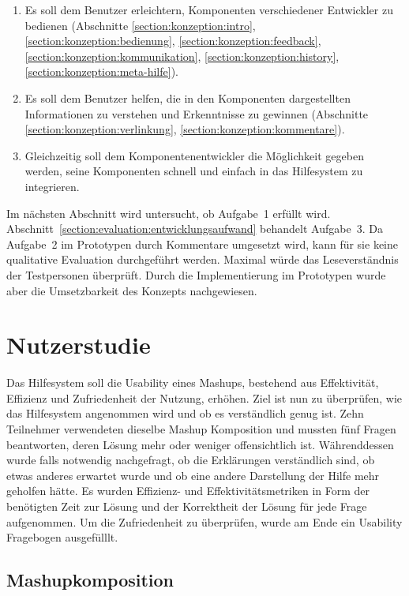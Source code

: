 \documentclass[
	headsepline,
	footsepline,
	fontsize=12pt,
	bibliography=totoc
]{scrbook}
\begin{document}
\begin{enumerate}
	\item Es soll dem Benutzer erleichtern, Komponenten verschiedener Entwickler zu bedienen (Abschnitte \ref{section:konzeption:intro}, \ref{section:konzeption:bedienung}, \ref{section:konzeption:feedback}, \ref{section:konzeption:kommunikation}, \ref{section:konzeption:history}, \ref{section:konzeption:meta-hilfe}).
	\item Es soll dem Benutzer helfen, die in den Komponenten dargestellten Informationen zu verstehen und Erkenntnisse zu gewinnen (Abschnitte \ref{section:konzeption:verlinkung}, \ref{section:konzeption:kommentare}).
	\item Gleichzeitig soll dem Komponentenentwickler die Möglichkeit gegeben werden, seine Komponenten schnell und einfach in das Hilfesystem zu integrieren.
\end{enumerate}

Im nächsten Abschnitt wird untersucht, ob Aufgabe~1 erfüllt wird. Abschnitt~\ref{section:evaluation:entwicklungsaufwand} behandelt Aufgabe~3. Da Aufgabe~2 im Prototypen durch Kommentare umgesetzt wird, kann für sie keine qualitative Evaluation durchgeführt werden. Maximal würde das Leseverständnis der Testpersonen überprüft. Durch die Implementierung im Prototypen wurde aber die Umsetzbarkeit des Konzepts nachgewiesen.

\section{Nutzerstudie}
\label{section:evaluation:nutzerstudie}

Das Hilfesystem soll die Usability eines Mashups, bestehend aus Effektivität, Effizienz und Zufriedenheit der Nutzung, erhöhen. Ziel ist nun zu überprüfen, wie das Hilfesystem angenommen wird und ob es verständlich genug ist. Zehn Teilnehmer verwendeten dieselbe Mashup Komposition und mussten fünf Fragen beantworten, deren Lösung mehr oder weniger offensichtlich ist. Währenddessen wurde falls notwendig nachgefragt, ob die Erklärungen verständlich sind, ob etwas anderes erwartet wurde und ob eine andere Darstellung der Hilfe mehr geholfen hätte. Es wurden Effizienz- und Effektivitätsmetriken in Form der benötigten Zeit zur Lösung und der Korrektheit der Lösung für jede Frage aufgenommen. Um die Zufriedenheit zu überprüfen, wurde am Ende ein Usability Fragebogen ausgefülllt.

\subsection{Mashupkomposition}
\end{document}
